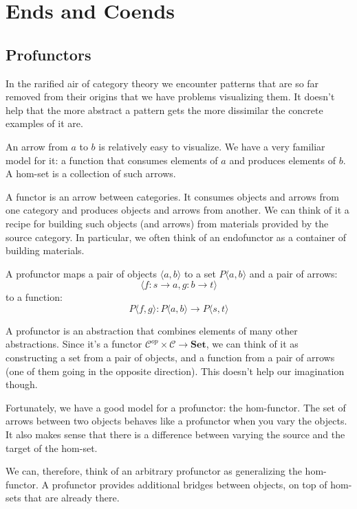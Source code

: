 \documentclass[DaoFP]{subfiles}
\begin{document}
\setcounter{chapter}{16}

\chapter{Ends and Coends}

\section{Profunctors}

In the rarified air of category theory we encounter patterns that are so far removed from their origins that we have problems visualizing them. It doesn't help that the more abstract a pattern gets the more dissimilar the concrete examples of it are. 

An arrow from $a$ to $b$ is relatively easy to visualize. We have a very familiar model for it: a function that consumes elements of $a$ and produces elements of $b$. A hom-set is a collection of such arrows. 

A functor is an arrow between categories. It consumes objects and arrows from one category and produces objects and arrows from another. We can think of it a recipe for building such objects (and arrows) from materials provided by the source category. In particular, we  often think of an endofunctor as a container of building materials.

A profunctor maps a pair of objects $\langle a, b \rangle$ to a set $P\langle a, b \rangle$ and a pair of arrows:
\[ \langle f \colon s \to a, g \colon b \to t \rangle \]
to a function:
\[ P\langle f, g \rangle \colon P\langle a, b \rangle \to P\langle s, t \rangle\]

A profunctor is an abstraction that combines elements of many other abstractions. Since it's a functor $ \mathcal{C}^{op} \times  \mathcal{C} \to \mathbf{Set}$, we can think of it as constructing a set from a pair of objects, and a function from a pair of arrows (one of them going in the opposite direction). This doesn't help our imagination though.

Fortunately, we have a good model for a profunctor: the hom-functor. The set of arrows between two objects behaves like a profunctor when you vary the objects. It also makes sense that there is a difference between varying the source and the target of the hom-set. 

We can, therefore, think of an arbitrary profunctor as generalizing the hom-functor. A profunctor provides additional bridges between objects, on top of hom-sets that are already there. 
\end{document}

